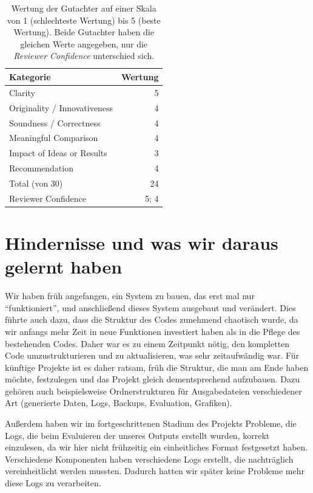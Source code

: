 \documentclass[a4paper]{article}
\begin{document}
\begin{table}
\centering
\begin{tabular}{lr}
\toprule
\textbf{Kategorie}            & \textbf{Wertung}  \\
\midrule
Clarity                      & 5            \\
Originality / Innovativeness & 4             \\
Soundness / Correctness      & 4            \\
Meaningful Comparison        & 4             \\
Impact of Ideas or Results   & 3              \\
Recommendation               & 4             \\
\midrule
Total (von 30)               & 24             \\
\midrule
Reviewer Confidence          & 5; 4          \\
\bottomrule
\end{tabular}
\caption{Wertung der Gutachter auf einer Skala von 1 (schlechteste Wertung) bis 5 (beste Wertung). Beide Gutachter haben die gleichen Werte angegeben, nur die \textit{Reviewer Confidence} unterschied sich.}
\label{tab:review}
\end{table}

\section{Hindernisse und was wir daraus gelernt haben}
\label{sec:takeaway}
Wir haben früh angefangen, ein System zu bauen, das erst mal nur \enquote{funktioniert}, und anschließend dieses System ausgebaut und verändert. Dies führte auch dazu, dass die Struktur des Codes zunehmend chaotisch wurde, da wir anfangs mehr Zeit in neue Funktionen investiert haben als in die Pflege des bestehenden Codes. Daher war es zu einem Zeitpunkt nötig, den kompletten Code umzustrukturieren und zu aktualisieren, was sehr zeitaufwändig war. Für künftige Projekte ist es daher ratsam, früh die Struktur, die man am Ende haben möchte, festzulegen und das Projekt gleich dementsprechend aufzubauen. Dazu gehören auch beispielsweise Ordnerstrukturen für Ausgabedateien verschiedener Art (generierte Daten, Logs, Backups, Evaluation, Grafiken).

Außerdem haben wir im fortgeschrittenen Stadium des Projekts Probleme, die Logs, die beim Evaluieren der unseres Outputs erstellt wurden, korrekt einzulesen, da wir hier nicht frühzeitig ein einheitliches Format festgesetzt haben. Verschiedene Komponenten haben verschiedene Logs erstellt, die nachträglich vereinheitlicht werden mussten. Dadurch hatten wir später keine Probleme mehr diese Logs zu verarbeiten.
\end{document}
